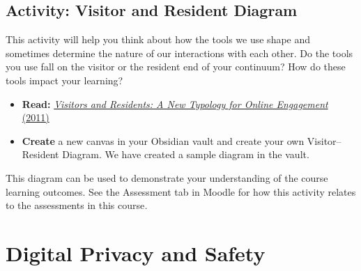 \documentclass[
  letterpaper,
  DIV=11,
  numbers=noendperiod]{scrreprt}
\providecommand{\tightlist}{%
  \setlength{\itemsep}{0pt}\setlength{\parskip}{0pt}}\usepackage{longtable,booktabs,array}
\begin{document}
\subsection{Activity: Visitor and Resident
Diagram}\label{activity-visitor-and-resident-diagram}

\begin{tcolorbox}[enhanced jigsaw, toprule=.15mm, colback=white, colframe=quarto-callout-note-color-frame, bottomtitle=1mm, leftrule=.75mm, coltitle=black, titlerule=0mm, rightrule=.15mm, colbacktitle=quarto-callout-note-color!10!white, left=2mm, title={Learning Activity}, opacitybacktitle=0.6, opacityback=0, breakable, toptitle=1mm, arc=.35mm, bottomrule=.15mm]

This activity will help you think about how the tools we use shape and
sometimes determine the nature of our interactions with each other. Do
the tools you use fall on the visitor or the resident end of your
continuum? How do these tools impact your learning?

\begin{itemize}
\tightlist
\item
  \textbf{Read:}
  \href{https://firstmonday.org/ojs/index.php/fm/article/view/3171}{\emph{Visitors
  and Residents: A New Typology for Online Engagement} (2011)}
\item
  \textbf{Create} a new canvas in your Obsidian vault and create your
  own Visitor--Resident Diagram. We have created a sample diagram in the
  vault.
\end{itemize}

\begin{tcolorbox}[enhanced jigsaw, toprule=.15mm, colback=white, colframe=quarto-callout-note-color-frame, arc=.35mm, opacityback=0, breakable, rightrule=.15mm, bottomrule=.15mm, leftrule=.75mm, left=2mm]

This diagram can be used to demonstrate your understanding of the course
learning outcomes. See the Assessment tab in Moodle for how this
activity relates to the assessments in this course\emph{.}

\end{tcolorbox}

\end{tcolorbox}

\section{Digital Privacy and Safety}\label{digital-privacy-and-safety}
\end{document}
